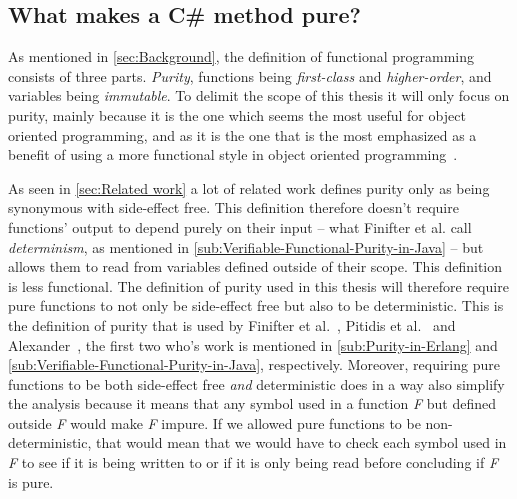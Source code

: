 \documentclass[a4paper,12pt]{article}
\begin{document}

\subsection{What makes a C\# method pure?} \label{sub:What makes a Cs program functional?}

As mentioned in \autoref{sec:Background}, the definition of functional programming consists of three parts. \textit{Purity}, functions being \textit{first-class} and \textit{higher-order}, and variables being \textit{immutable}. To delimit the scope of this thesis it will only focus on purity, mainly because it is the one which seems the most useful for object oriented programming, and as it is the one that is the most emphasized as a benefit of using a more functional style in object oriented programming~\cite{alvin-alexander}. %

As seen in \autoref{sec:Related work} a lot of related work defines purity only as being synonymous with side-effect free. This definition therefore doesn't require functions' output to depend purely on their input -- what Finifter et al. call \textit{determinism}, as mentioned in \autoref{sub:Verifiable-Functional-Purity-in-Java} -- but allows them to read from variables defined outside of their scope. This definition is less functional. The definition of purity used in this thesis will therefore require pure functions to not only be side-effect free but also to be deterministic. This is the definition of purity that is used by Finifter et al.~\cite{purity-in-java}, Pitidis et al.~\cite{pitidis2010purity} and Alexander~\cite{alvin-alexander}, %
the first two who's work is mentioned in \autoref{sub:Purity-in-Erlang} and \autoref{sub:Verifiable-Functional-Purity-in-Java}, respectively. Moreover, requiring pure functions to be both side-effect free \textit{and} deterministic does in a way also simplify the analysis because it means that any symbol used in a function \textit{F} but defined outside \textit{F} would make \textit{F} impure. If we allowed pure functions to be non-deterministic, that would mean that we would have to check each symbol used in \textit{F} to see if it is being written to or if it is only being read before concluding if \textit{F} is pure.
\end{document}

